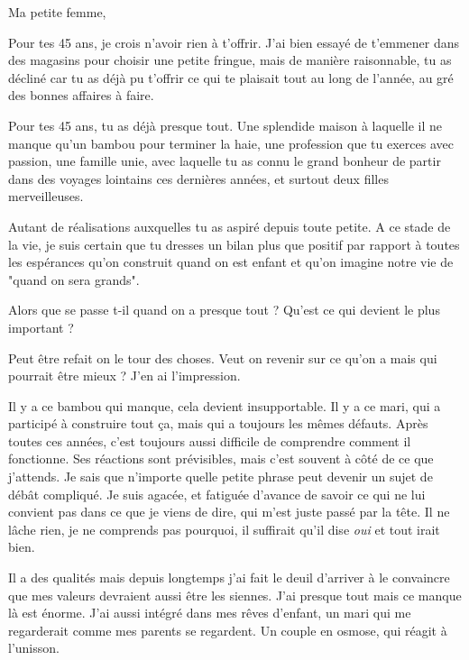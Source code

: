 \documentclass[a4paper,10pt]{letter}
\date{Le 10 juillet 2018}
\begin{document}
\begin{letter}{}
\opening{Ma petite femme,}

Pour tes 45 ans, je crois n'avoir rien à t'offrir. 
J'ai bien essayé de t'emmener dans des magasins pour choisir une petite fringue, mais de manière raisonnable, tu as décliné car tu as déjà pu t'offrir ce qui te plaisait tout au long de l'année, au gré des bonnes affaires à faire.

Pour tes 45 ans, tu as déjà presque tout. 
Une splendide maison à laquelle il ne manque qu'un bambou pour terminer la haie, une profession que tu exerces avec passion, une famille unie, avec laquelle tu as connu le grand bonheur de partir dans des voyages lointains ces dernières années, et surtout deux filles merveilleuses.

Autant de réalisations auxquelles tu as aspiré depuis toute petite. 
A ce stade de la vie, je suis certain que tu dresses un bilan plus que positif par rapport à toutes les espérances qu'on construit quand on est enfant et qu'on imagine notre vie de "quand on sera grands".

Alors que se passe t-il quand on a presque tout ?
Qu'est ce qui devient le plus important ?

Peut être refait on le tour des choses. Veut on revenir sur ce qu'on a mais qui pourrait être mieux ?
J'en ai l'impression. 

Il y a ce bambou qui manque, cela devient insupportable. 
Il y a ce mari, qui a participé à construire tout ça, mais qui a toujours les mêmes défauts.
Après toutes ces années, c'est toujours aussi difficile de comprendre comment il fonctionne.
Ses réactions sont prévisibles, mais c'est souvent à côté de ce que j'attends. 
Je sais que n'importe quelle petite phrase peut devenir un sujet de débât compliqué. 
Je suis agacée, et fatiguée d'avance de savoir ce qui ne lui convient pas dans ce que je viens de dire, 
qui m'est juste passé par la tête. Il ne lâche rien, je ne comprends pas pourquoi, 
il suffirait qu'il dise \emph{oui} et tout irait bien.

Il a des qualités mais depuis longtemps j'ai fait le deuil d'arriver à le convaincre que mes valeurs 
devraient aussi être les siennes. J'ai presque tout mais ce manque là est énorme. J'ai aussi intégré dans mes rêves 
d'enfant, un mari qui me regarderait comme mes parents se regardent. Un couple en osmose, qui réagit à l'unisson.


\end{letter}
\end{document}
